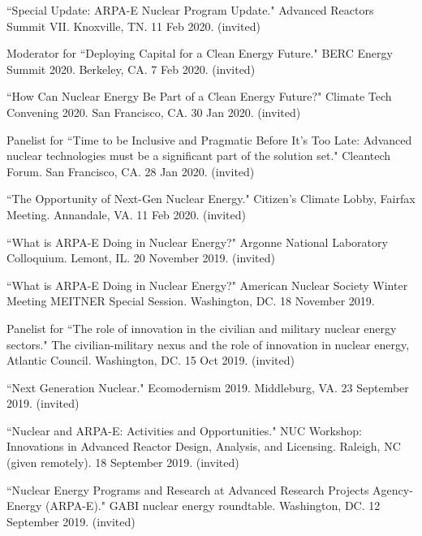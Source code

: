 \begin{bibsection}
\item ``Special Update: ARPA-E Nuclear Program Update." Advanced Reactors Summit VII. Knoxville, TN. 11 Feb 2020.
(invited)

\item Moderator for ``Deploying Capital for a Clean Energy Future." BERC Energy Summit 2020. Berkeley, CA. 7 Feb 2020.
(invited)

\item ``How Can Nuclear Energy Be Part of a Clean Energy Future?" Climate Tech Convening 2020. San Francisco, CA. 30 Jan 2020.
(invited)

\item Panelist for ``Time to be Inclusive and Pragmatic Before It’s Too Late: Advanced nuclear technologies must be a significant part of the solution set." Cleantech Forum. San Francisco, CA. 28 Jan 2020.
(invited)

\item ``The Opportunity of Next-Gen Nuclear Energy." Citizen's Climate Lobby, Fairfax Meeting. Annandale, VA. 11 Feb 2020.
(invited)

\item ``What is ARPA-E Doing in Nuclear Energy?" Argonne National
Laboratory Colloquium. Lemont, IL. 20 November 2019. (invited)

\item ``What is ARPA-E Doing in Nuclear Energy?" American
Nuclear Society Winter Meeting MEITNER Special Session. Washington, DC. 18
November 2019.

\item Panelist for ``The role of innovation in the civilian and
military nuclear energy sectors." The civilian-military nexus and the role of
innovation in nuclear energy, Atlantic Council. Washington, DC. 15 Oct 2019.
(invited)

\item ``Next Generation Nuclear." Ecomodernism 2019.
Middleburg, VA. 23 September 2019. (invited)

\item ``Nuclear and ARPA-E: Activities and Opportunities." NUC
Workshop: Innovations in Advanced Reactor Design, Analysis, and Licensing.
Raleigh, NC (given remotely). 18 September 2019. (invited)

\item ``Nuclear Energy Programs and Research at Advanced
Research Projects Agency-Energy (ARPA-E)." GABI nuclear energy roundtable.
Washington, DC. 12 September 2019. (invited)


\end{bibsection}
